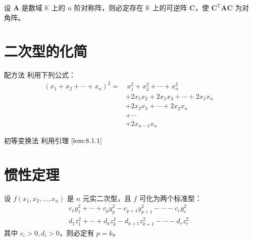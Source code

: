 \begin{theorem}
    设 $\bm{A}$ 是数域 $\mathbb{K}$ 上的 $n$ 阶对称阵，则必定存在 $\mathbb{K}$ 上的可逆阵 $\bm{C}$，使 $\bm{C}^{\mathrm{T}}\bm{AC}$ 为对角阵。
\end{theorem}



\section{二次型的化简}

\begin{proposition}{配方法}
    利用下列公式：
    \begin{align*}
        (x_1 + x_2 + \cdots + x_n)^2 = & \ x_{1}^{2} + x_{2}^{2} + \cdots + x_{n}^{2}       \\
                                       & + 2x_{1}x_{2} + 2x_{1}x_{3} + \cdots + 2x_{1}x_{n} \\
                                       & + 2x_{2}x_{3} + \cdots + 2x_{2}x_{n}               \\
                                       & + \cdots                                           \\
                                       & + 2x_{n - 1}x_{n}
    \end{align*}
\end{proposition}

\begin{proposition}{初等变换法}
    利用引理 $\ref{lem:8.1.1}$
\end{proposition}






\section{惯性定理}

\begin{definition}
    设 $f(x_1, x_2, \ldots, x_n)$ 是 $n$ 元实二次型，且 $f$ 可化为两个标准型：
    \begin{gather*}
        c_{1}y_{1}^{2} + \cdots + c_{p}y_{p}^{2} - c_{p + 1}y_{p + 1}^{2} - \cdots - c_{r}y_{r}^{2} \\
        d_{1}z_{1}^{2} + \cdots + d_{k}z_{k}^{2} - d_{k + 1}z_{k + 1}^{2} - \cdots - d_{r}z_{r}^{2}
    \end{gather*}
    其中 $c_{i} > 0, d_{i} > 0$，则必定有 $p = k$。
\end{definition}

